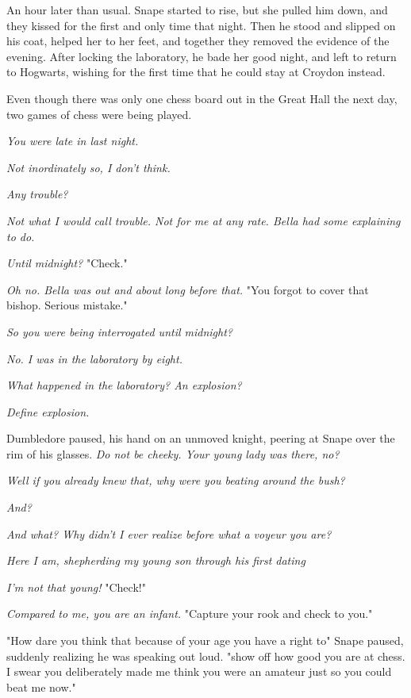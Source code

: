 An hour later than usual. Snape started to rise, but she pulled him down, and they kissed for the first and only time that night. Then he stood and slipped on his coat, helped her to her feet, and together they removed the evidence of the evening. After locking the laboratory, he bade her good night, and left to return to Hogwarts, wishing for the first time that he could stay at Croydon instead.

Even though there was only one chess board out in the Great Hall the next day, two games of chess were being played.

\emph{You were late in last night.}

\emph{Not inordinately so, I don't think.}

\emph{Any trouble?}

\emph{Not what I would call trouble. Not for me at any rate. Bella had some explaining to do.}

\emph{Until midnight?} "Check."

\emph{Oh no. Bella was out and about long before that.} "You forgot to cover that bishop. Serious mistake."

\emph{So you were being interrogated until midnight?}

\emph{No. I was in the laboratory by eight.}

\emph{What happened in the laboratory? An explosion?}

\emph{Define explosion.}

Dumbledore paused, his hand on an unmoved knight, peering at Snape over the rim of his glasses. \emph{Do not be cheeky. Your young lady was there, no?}

\emph{Well if you already knew that, why were you beating around the bush?}

\emph{And?}

\emph{And what? Why didn't I ever realize before what a voyeur you are?}

\emph{Here I am, shepherding my young son through his first dating{\el}}

\emph{I'm not that young!} "Check!"

\emph{Compared to me, you are an infant.} "Capture your rook and check to you."

"How dare you think that because of your age you have a right to{\el}" Snape paused, suddenly realizing he was speaking out loud. "{\el}show off how good you are at chess. I swear you deliberately made me think you were an amateur just so you could beat me now."

